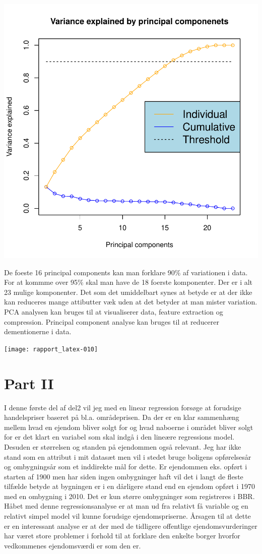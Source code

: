 \documentclass{report}
\begin{document}
\includegraphics{rapport_latex-009}

De foeste 16 principal components kan man forklare 90\% af variationen i data. For at kommme over 95\% skal man have de 18 foerste komponenter. Der er i alt 23 mulige komponenter.
Det som det umiddelbart synes at betyde er at der ikke kan reduceres mange attibutter væk uden at det betyder at man mister variation.
PCA analysen kan bruges til at visualiserer data, feature extraction og compression.
Principal component analyse kan bruges til at reducerer dementionerne i data.

\texttt{[image: rapport\_latex-010]}


\chapter{Part II}

I denne første del af del2 vil jeg med en linear regression forsøge at forudsige handelspriser baseret på bl.a. områdeprisen. Da der er en klar sammenhæng mellem hvad en ejendom bliver solgt for og hvad naboerne i området bliver solgt for er det klart en variabel som skal indgå i den lineære regressions model. Desuden er størrelsen og standen på ejendommen også relevant. Jeg har ikke stand som en attribut i mit datasæt men vil i stedet bruge boligens opførelsesår og ombygningsår som et inddirekte mål for dette. Er ejendommen eks. opført i starten af 1900 men har siden ingen ombygninger haft vil det i langt de fleste tilfælde betyde at bygningen er i en dårligere stand end en ejendom opført i 1970 med en ombygning i 2010. Det er kun større ombygninger som registreres i BBR. 
Håbet med denne regressionsanalyse er at man ud fra relativt få variable og en relativt simpel model vil kunne forudsige ejendomspriserne. Årsagen til at dette er en interessant analyse er at der med de tidligere offentlige ejendomsvurderinger har været store problemer i forhold til at forklare den enkelte borger hvorfor vedkommenes ejendomsværdi er som den er. 
\end{document}
